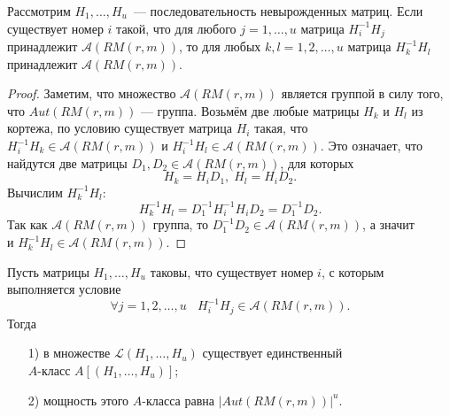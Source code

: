 \begin{lemma}
\label{lem1} Рассмотрим $H_1,\ldots,H_u$~--- последовательность невырожденных матриц. Если существует номер $i$ такой, что для любого
$j=1,\ldots,u$ матрица $H^{-1}_iH_j$ принадлежит $\mathcal
A(RM(r,m))$, то для любых $k,l=1,2,\ldots,u$ матрица $H^{-1}_kH_l$
принадлежит $\mathcal A(RM(r,m))$.
\end{lemma}
\begin{proof}
Заметим, что множество $\mathcal A(RM(r,m))$ является группой в
силу того, что $Aut(RM(r,m))$ --- группа. Возьмём две любые
матрицы $H_k$ и $H_l$ из кортежа, по условию существует матрица
$H_i$ такая, что $H^{-1}_iH_k\in\mathcal A(RM(r,m))$ и
$H^{-1}_iH_l\in\mathcal A(RM(r,m))$. Это означает, что найдутся
две матрицы $D_1,D_2\in\mathcal A(RM(r,m))$, для которых
$$
H_k=H_iD_1,\;H_l=H_iD_2.
$$
Вычислим $H^{-1}_kH_l$:
$$
H^{-1}_kH_l=D^{-1}_1H^{-1}_iH_iD_2=D^{-1}_1D_2.
$$
Так как $\mathcal A(RM(r,m))$ группа, то $D^{-1}_1D_2\in\mathcal
A(RM(r,m))$, а значит\\ и $H^{-1}_kH_l\in\mathcal A(RM(r,m))$.
\end{proof}
\begin{proposition}
\label{prop2} Пусть матрицы $H_1,\ldots,H_u$ таковы, что
существует номер $i$, с которым выполняется условие
$$
\forall j=1,2,\ldots,u\ \ \ \ H^{-1}_iH_j\in\mathcal A(RM(r,m)).
$$
Тогда
\begin{itemize}
\item[1)] в множестве $\mathcal L(H_1,\ldots,H_u)$ существует единственный\\ $A$-класс $A[(H_1,\ldots,H_u)]$;
\item[2)] мощность этого $A$-класса равна $|Aut(RM(r,m))|^u$.
\end{itemize}
\end{proposition}
